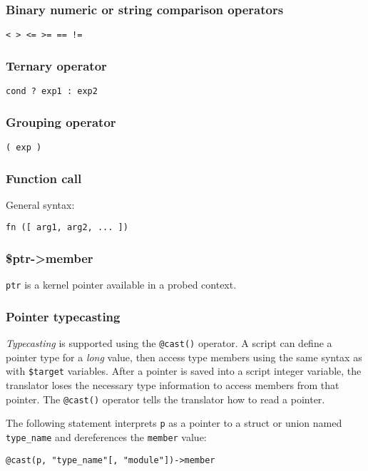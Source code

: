 \documentclass[twoside,english]{article}
\newenvironment{vindent}
{\begin{list}{}{\setlength{\listparindent}{6pt}}
\item[]}
{\end{list}}
\begin{document}
\subsubsection{Binary numeric or string comparison operators}
\texttt{< > <= >= == !=}

\subsubsection{Ternary operator\label{sub:Ternary-operator}}
\texttt{cond ? exp1 : exp2}


\subsubsection{Grouping operator}
\texttt{( exp )}


\subsubsection{Function call}
General syntax:

\texttt{fn ({[} arg1, arg2, ... ])}


\subsubsection{\$ptr-\textgreater member}
\texttt{ptr} is a kernel pointer available in a probed context.


\subsubsection{Pointer typecasting}

\emph{Typecasting} is supported using the \texttt{@cast()} operator. A
script can define a pointer type for a \emph{long} value, then access
type members using the same syntax as with \texttt{\$target}
variables. After a pointer is saved into a script integer variable,
the translator loses the necessary type information to access members
from that pointer.  The \texttt{@cast()} operator tells the translator
how to read a pointer.

The following statement interprets \texttt{p} as a pointer to a struct
or union named \texttt{type\_name} and dereferences the
\texttt{member} value:
\begin{vindent}
\begin{verbatim}
@cast(p, "type_name"[, "module"])->member
\end{verbatim}
\end{vindent}
\end{document}

